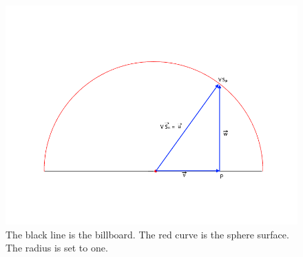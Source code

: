 \documentclass{ACGSeminar}
\begin{document}
\begin{figure}[b!]
  \begin{centering}
    \includegraphics[width=15cm]{figures/particle_shader.png}\par
  \end{centering}
  \caption{The black line is the billboard. The red curve is the sphere surface. The radius is set to one.}
  \label{fig:particle_shader}
\end{figure}
\end{document}
